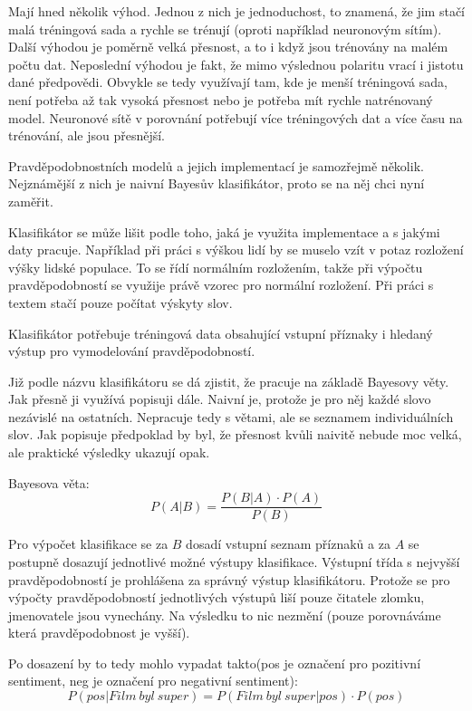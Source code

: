 Mají hned několik výhod. Jednou z nich je jednoduchost, to znamená, že jim stačí malá tréningová sada a rychle se trénují (oproti například neuronovým sítím). Další výhodou je poměrně velká přesnost, a to i když jsou trénovány na malém počtu dat. Neposlední výhodou je fakt, že mimo výslednou polaritu vrací i jistotu dané předpovědi. Obvykle se tedy využívají tam, kde je menší tréningová sada, není potřeba až tak vysoká přesnost nebo je potřeba mít rychle natrénovaný model. Neuronové sítě v porovnání potřebují více tréningových dat a více času na trénování, ale jsou přesnější.

Pravděpodobnostních modelů  a jejich implementací je samozřejmě několik. Nejznámější z nich je naivní Bayesův klasifikátor, proto se na něj chci nyní zaměřit.

Klasifikátor se může lišit podle toho, jaká je využita implementace a s jakými daty pracuje. Například při práci s výškou lidí by se muselo vzít v potaz rozložení výšky lidské populace. To se řídí normálním rozložením, takže při výpočtu pravděpodobností se využije právě vzorec pro normální rozložení. Při práci s textem stačí pouze počítat výskyty slov.

Klasifikátor potřebuje tréningová data obsahující vstupní příznaky i hledaný výstup pro vymodelování pravděpodobností.

Již podle názvu klasifikátoru se dá zjistit, že pracuje na základě Bayesovy věty. Jak přesně ji využívá popisuji dále. Naivní je, protože je pro něj každé slovo nezávislé na ostatních. Nepracuje tedy s větami, ale se seznamem individuálních slov.
Jak popisuje \cite{prob1} předpoklad by byl, že přesnost kvůli naivitě nebude moc velká, ale praktické výsledky ukazují opak.

Bayesova věta:
\begin{equation}
  P(A|B)=\frac{P(B|A)\cdot P(A)}{P(B)}
  \label{eq:rovnice1}
\end{equation}

Pro výpočet klasifikace se za $B$ dosadí vstupní seznam příznaků a za $A$ se postupně dosazují jednotlivé možné výstupy klasifikace. Výstupní třída s nejvyšší pravděpodobností je prohlášena za správný výstup klasifikátoru. Protože se pro výpočty pravděpodobností jednotlivých výstupů liší pouze čitatele zlomku, jmenovatele jsou vynechány. Na výsledku to nic nezmění (pouze porovnáváme která pravděpodobnost je vyšší).

Po dosazení by to tedy mohlo vypadat takto(pos je označení pro pozitivní sentiment, neg je označení pro negativní sentiment):
\begin{equation}
  P(pos|Film\:byl\:super)=P(Film\:byl\:super|pos)\cdot P(pos)
\end{equation}

